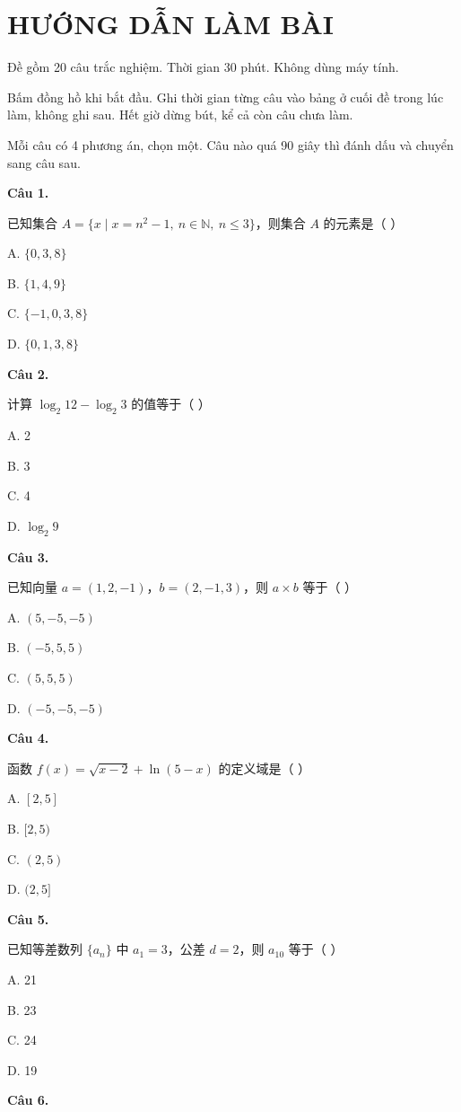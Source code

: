 \documentclass[11pt, a4paper]{article}
\begin{document}

\section{HƯỚNG DẪN LÀM BÀI}

Đề gồm 20 câu trắc nghiệm. Thời gian 30 phút. Không dùng máy tính.

Bấm đồng hồ khi bắt đầu. Ghi thời gian từng câu vào bảng ở cuối đề trong lúc làm, không ghi sau. Hết giờ dừng bút, kể cả còn câu chưa làm.

Mỗi câu có 4 phương án, chọn một. Câu nào quá 90 giây thì đánh dấu và chuyển sang câu sau.

\textbf{Câu 1.}

已知集合 $A=\{x\mid x=n^2-1,\ n\in\mathbb{N},\ n\le3\}$，则集合 $A$ 的元素是（ ）

A. $\{0,3,8\}$

B. $\{1,4,9\}$

C. $\{-1,0,3,8\}$

D. $\{0,1,3,8\}$

\textbf{Câu 2.}

计算 $\log_2 12-\log_2 3$ 的值等于（ ）

A. 2

B. 3

C. 4

D. $\log_2 9$

\textbf{Câu 3.}

已知向量 $a=(1,2,-1)$，$b=(2,-1,3)$，则 $a\times b$ 等于（ ）

A. $(5,-5,-5)$

B. $(-5,5,5)$

C. $(5,5,5)$

D. $(-5,-5,-5)$

\textbf{Câu 4.}

函数 $f(x)=\sqrt{x-2}+\ln(5-x)$ 的定义域是（ ）

A. $[2,5]$

B. $[2,5)$

C. $(2,5)$

D. $(2,5]$

\textbf{Câu 5.}

已知等差数列 $\{a_n\}$ 中 $a_1=3$，公差 $d=2$，则 $a_{10}$ 等于（ ）

A. 21

B. 23

C. 24

D. 19

\textbf{Câu 6.}
\end{document}
